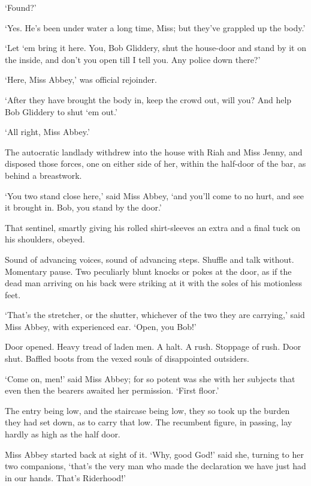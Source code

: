 ‘Found?’

‘Yes. He’s been under water a long time, Miss; but they’ve grappled up
the body.’

‘Let ‘em bring it here. You, Bob Gliddery, shut the house-door and stand
by it on the inside, and don’t you open till I tell you. Any police down
there?’

‘Here, Miss Abbey,’ was official rejoinder.

‘After they have brought the body in, keep the crowd out, will you? And
help Bob Gliddery to shut ‘em out.’

‘All right, Miss Abbey.’

The autocratic landlady withdrew into the house with Riah and Miss
Jenny, and disposed those forces, one on either side of her, within the
half-door of the bar, as behind a breastwork.

‘You two stand close here,’ said Miss Abbey, ‘and you’ll come to no
hurt, and see it brought in. Bob, you stand by the door.’

That sentinel, smartly giving his rolled shirt-sleeves an extra and a
final tuck on his shoulders, obeyed.

Sound of advancing voices, sound of advancing steps. Shuffle and talk
without. Momentary pause. Two peculiarly blunt knocks or pokes at the
door, as if the dead man arriving on his back were striking at it with
the soles of his motionless feet.

‘That’s the stretcher, or the shutter, whichever of the two they are
carrying,’ said Miss Abbey, with experienced ear. ‘Open, you Bob!’

Door opened. Heavy tread of laden men. A halt. A rush. Stoppage of rush.
Door shut. Baffled boots from the vexed souls of disappointed outsiders.

‘Come on, men!’ said Miss Abbey; for so potent was she with her subjects
that even then the bearers awaited her permission. ‘First floor.’

The entry being low, and the staircase being low, they so took up the
burden they had set down, as to carry that low. The recumbent figure, in
passing, lay hardly as high as the half door.

Miss Abbey started back at sight of it. ‘Why, good God!’ said she,
turning to her two companions, ‘that’s the very man who made the
declaration we have just had in our hands. That’s Riderhood!’


